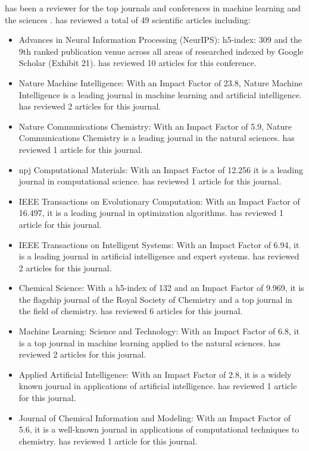 \documentclass[11pt]{article}
\begin{document}
\dr has been a reviewer for the top journals and conferences in machine learning and the sciences \cite{reviews}. \dr has reviewed a total of 49 scientific articles including:
\begin{itemize}
    \item Advances in Neural Information Processing (NeurIPS): h5-index: 309 and the 9th ranked publication venue across all areas of researched indexed by Google Scholar (Exhibit 21). \dr has reviewed 10 articles for this conference.
    \item Nature Machine Intelligence: With an Impact Factor of 23.8, Nature Machine Intelligence is a leading journal in machine learning and artificial intelligence. \dr has reviewed 2 articles for this journal.
    \item Nature Communications Chemistry: With an Impact Factor of 5.9, Nature Communications Chemistry is a leading journal in the natural sciences. \dr has reviewed 1 article for this journal.
    \item npj Computational Materials: With an Impact Factor of 12.256 it is a leading journal in computational science. \dr has reviewed 1 article for this journal.
    \item IEEE Transactions on Evolutionary Computation: With an Impact Factor of 16.497, it is a leading journal in optimization algorithms. \dr has reviewed 1 article for this journal.
    \item IEEE Transactions on Intelligent Systems: With an Impact Factor of 6.94, it is a leading journal in artificial intelligence and expert systems. \dr has reviewed 2 articles for this journal.
    \item Chemical Science: With a h5-index of 132 and an Impact Factor of 9.969, it is the flagship journal of the Royal Society of Chemistry and a top journal in the field of chemistry. \dr has reviewed 6 articles for this journal.
    \item Machine Learning: Science and Technology: With an Impact Factor of 6.8, it is a top journal in machine learning applied to the natural sciences. \dr has reviewed 2 articles for this journal.
    \item Applied Artificial Intelligence: With an Impact Factor of 2.8, it is a widely known journal in applications of artificial intelligence. \dr has reviewed 1 article for this journal.
    \item Journal of Chemical Information and Modeling: With an Impact Factor of 5.6, it is a well-known journal in applications of computational techniques to chemistry. \dr has reviewed 1 article for this journal.

\end{itemize}
\end{document}
